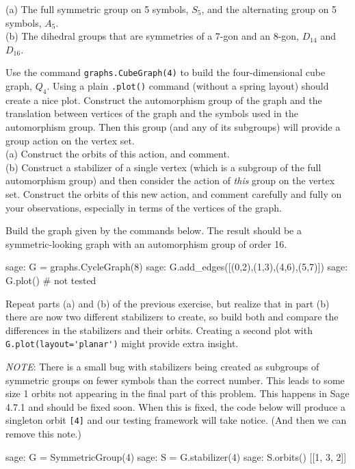 (a) The full symmetric group on 5 symbols, $S_5$, and the alternating group on 5 symbols, $A_5$.\\
(b) The dihedral groups that are symmetries of a $7$-gon and an $8$-gon, $D_{14}$ and $D_{16}$.
\begin{sageverbatim}\end{sageverbatim}
%
%
Use the command \verb?graphs.CubeGraph(4)? to build the four-dimensional cube graph, $Q_4$.  Using a plain \verb?.plot()? command (without a spring layout) should create a nice plot.  Construct the automorphism group of the graph and the translation between vertices of the graph and the symbols used in the automorphism group.  Then this group (and any of its subgroups) will provide a group action on the vertex set.\\
%
(a) Construct the orbits of this action, and comment.\\
(b) Construct a stabilizer of a single vertex (which is a subgroup of the full automorphism group) and then consider the action of \emph{this} group on the vertex set.  Construct the orbits of this new action, and comment carefully and fully on your observations, especially in terms of the vertices of the graph.
\begin{sageverbatim}\end{sageverbatim}
%
%
Build the graph given by the commands below.  The result should be a symmetric-looking graph with an automorphism group of order 16.
%
%
\begin{sageexample}
sage: G = graphs.CycleGraph(8)
sage: G.add_edges([(0,2),(1,3),(4,6),(5,7)])
sage: G.plot()                  # not tested
\end{sageexample}
%
Repeat parts (a) and (b) of the previous exercise, but realize that in part (b) there are now two different stabilizers to create, so build both and compare the differences in the stabilizers and their orbits.  Creating a second plot with \verb?G.plot(layout='planar')? might provide extra insight.\par
%
\emph{NOTE}: There is a small bug with stabilizers being created as subgroups of symmetric groups on fewer symbols than the correct number.  This leads to some size 1 orbits not appearing in the final part of this problem.  This happens in Sage 4.7.1 and should be fixed soon.  When this is fixed, the code below will produce a singleton orbit \texttt{[4]} and our testing framework will take notice.  (And then we can remove this note.)
%
\begin{sageexample}
sage: G = SymmetricGroup(4)
sage: S = G.stabilizer(4)
sage: S.orbits()
[[1, 3, 2]]
\end{sageexample}
%

